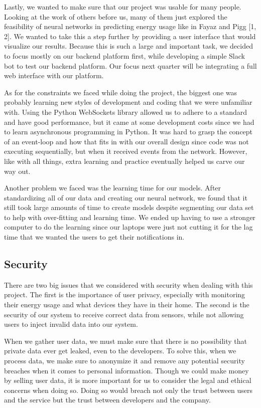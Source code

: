 \documentclass[conference]{IEEEtran}
\begin{document}
Lastly, we wanted to make sure that our project was usable for many people. Looking at the work of others before us, many of them just explored the feasibility of neural networks in predicting energy usage like in Fayaz and Pigg [1, 2]. We wanted to take this a step further by providing a user interface that would visualize our results. Because this is such a large and important task, we decided to focus mostly on our backend platform first, while developing a simple Slack bot to test our backend platform. Our focus next quarter will be integrating a full web interface with our platform.

As for the constraints we faced while doing the project, the biggest one was probably learning new styles of development and coding that we were unfamiliar with. Using the Python WebSockets library allowed us to adhere to a standard and have good performance, but it came at some development costs since we had to learn asynchronous programming in Python. It was hard to grasp the concept of an event-loop and how that fits in with our overall design since code was not executing sequentially, but when it received events from the network. However, like with all things, extra learning and practice eventually helped us carve our way out.

Another problem we faced was the learning time for our models. After standardizing all of our data and creating our neural network, we found that it still took large amounts of time to create models despite segmenting our data set to help with over-fitting and learning time. We ended up having to use a stronger computer to do the learning since our laptops were just not cutting it for the lag time that we wanted the users to get their notifications in.

\subsection{Security}
There are two big issues that we considered with security when dealing with this project. The first is the importance of user privacy, especially with monitoring their energy usage and what devices they have in their home. The second is the security of our system to receive correct data from sensors, while not allowing users to inject invalid data into our system.

When we gather user data, we must make sure that there is no possibility that private data ever get leaked, even to the developers. To solve this, when we process data, we make sure to anonymize it and remove any potential security breaches when it comes to personal information. Though we could make money by selling user data, it is more important for us to consider the legal and ethical concerns when doing so. Doing so would breach not only the trust between users and the service but the trust between developers and the company.
\end{document}
